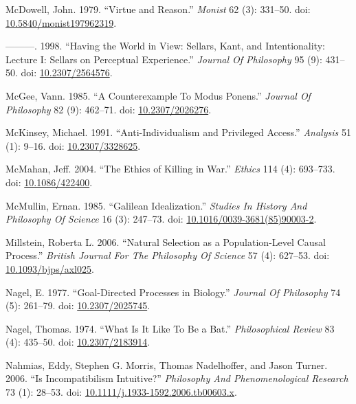 \documentclass[
  10pt,
  letterpaper,
  DIV=11,
  numbers=noendperiod,
  twoside]{scrartcl}
\newlength{\cslhangindent}
\newenvironment{CSLReferences}[2] %
 {\begin{list}{}{%
  \setlength{\itemindent}{0pt}
  \setlength{\leftmargin}{0pt}
  \setlength{\parsep}{0pt}
  \ifodd #1
   \setlength{\leftmargin}{\cslhangindent}
   \setlength{\itemindent}{-1\cslhangindent}
  \fi
  \setlength{\itemsep}{#2\baselineskip}}}
 {\end{list}}
\begin{document}
\begin{CSLReferences}{1}{0}
McDowell, John. 1979. {``Virtue and Reason.''} \emph{Monist} 62 (3):
331--50. doi:
\href{https://doi.org/10.5840/monist197962319}{10.5840/monist197962319}.

---------. 1998. {``Having the World in View: Sellars, Kant, and
Intentionality: Lecture I: Sellars on Perceptual Experience.''}
\emph{Journal Of Philosophy} 95 (9): 431--50. doi:
\href{https://doi.org/10.2307/2564576}{10.2307/2564576}.

McGee, Vann. 1985. {``A Counterexample To Modus Ponens.''} \emph{Journal
Of Philosophy} 82 (9): 462--71. doi:
\href{https://doi.org/10.2307/2026276}{10.2307/2026276}.

McKinsey, Michael. 1991. {``Anti-Individualism and Privileged Access.''}
\emph{Analysis} 51 (1): 9--16. doi:
\href{https://doi.org/10.2307/3328625}{10.2307/3328625}.

McMahan, Jeff. 2004. {``The Ethics of Killing in War.''} \emph{Ethics}
114 (4): 693--733. doi:
\href{https://doi.org/10.1086/422400}{10.1086/422400}.

McMullin, Ernan. 1985. {``Galilean Idealization.''} \emph{Studies In
History And Philosophy Of Science} 16 (3): 247--73. doi:
\href{https://doi.org/10.1016/0039-3681(85)90003-2}{10.1016/0039-3681(85)90003-2}.

Millstein, Roberta L. 2006. {``Natural Selection as a Population-Level
Causal Process.''} \emph{British Journal For The Philosophy Of Science}
57 (4): 627--53. doi:
\href{https://doi.org/10.1093/bjps/axl025}{10.1093/bjps/axl025}.

Nagel, E. 1977. {``Goal-Directed Processes in Biology.''} \emph{Journal
Of Philosophy} 74 (5): 261--79. doi:
\href{https://doi.org/10.2307/2025745}{10.2307/2025745}.

Nagel, Thomas. 1974. {``What Is It Like To Be a Bat.''}
\emph{Philosophical Review} 83 (4): 435--50. doi:
\href{https://doi.org/10.2307/2183914}{10.2307/2183914}.

Nahmias, Eddy, Stephen G. Morris, Thomas Nadelhoffer, and Jason Turner.
2006. {``Is Incompatibilism Intuitive?''} \emph{Philosophy And
Phenomenological Research} 73 (1): 28--53. doi:
\href{https://doi.org/10.1111/j.1933-1592.2006.tb00603.x}{10.1111/j.1933-1592.2006.tb00603.x}.


\end{CSLReferences}
\end{document}
